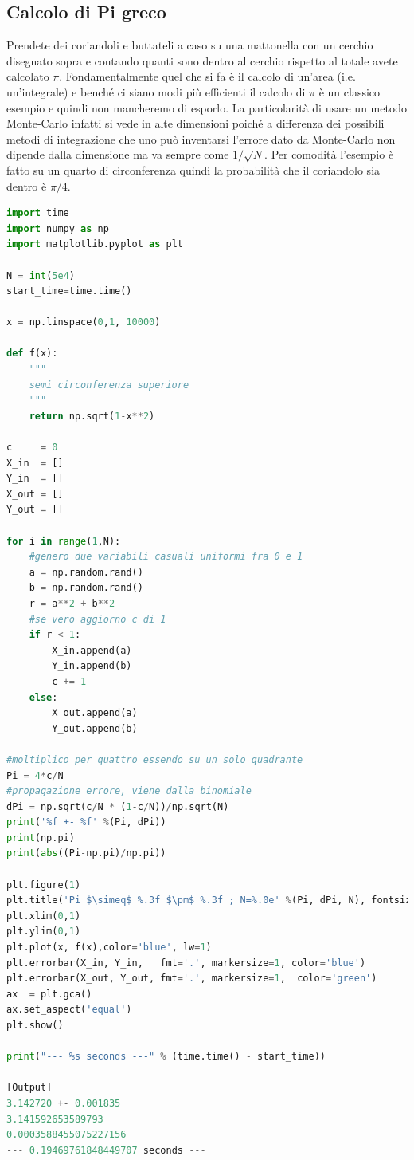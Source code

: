 \documentclass[10pt,a4paper]{article}
\begin{document}
\subsection{Calcolo di Pi greco}
Prendete dei coriandoli e buttateli a caso su una mattonella con un cerchio disegnato sopra e contando quanti sono dentro al cerchio rispetto al totale avete calcolato $\pi$.
Fondamentalmente quel che si fa è il calcolo di un'area (i.e. un'integrale) e benché ci siano modi più efficienti il calcolo di $\pi$ è un classico esempio e quindi non mancheremo di esporlo. La particolarità di usare un metodo Monte-Carlo infatti si vede in alte dimensioni poiché a differenza dei possibili metodi di integrazione che uno può inventarsi l'errore dato da Monte-Carlo non dipende dalla dimensione ma va sempre come $1/\sqrt{N}$. Per comodità l'esempio è fatto su un quarto di circonferenza quindi la probabilità che il coriandolo sia dentro è $\pi/4$.

\begin{lstlisting}[language=Python]
import time
import numpy as np
import matplotlib.pyplot as plt

N = int(5e4)
start_time=time.time()

x = np.linspace(0,1, 10000)

def f(x):
    """
    semi circonferenza superiore
    """
    return np.sqrt(1-x**2)

c     = 0
X_in  = []
Y_in  = []
X_out = []
Y_out = []

for i in range(1,N):
    #genero due variabili casuali uniformi fra 0 e 1
    a = np.random.rand()
    b = np.random.rand()
    r = a**2 + b**2
    #se vero aggiorno c di 1
    if r < 1:
        X_in.append(a)
        Y_in.append(b)
        c += 1
    else:
        X_out.append(a)
        Y_out.append(b)

#moltiplico per quattro essendo su un solo quadrante
Pi = 4*c/N
#propagazione errore, viene dalla binomiale
dPi = np.sqrt(c/N * (1-c/N))/np.sqrt(N)
print('%f +- %f' %(Pi, dPi))
print(np.pi)
print(abs((Pi-np.pi)/np.pi))

plt.figure(1)
plt.title('Pi $\simeq$ %.3f $\pm$ %.3f ; N=%.0e' %(Pi, dPi, N), fontsize=20)
plt.xlim(0,1)
plt.ylim(0,1)
plt.plot(x, f(x),color='blue', lw=1)
plt.errorbar(X_in, Y_in,   fmt='.', markersize=1, color='blue')
plt.errorbar(X_out, Y_out, fmt='.', markersize=1,  color='green')
ax  = plt.gca()
ax.set_aspect('equal')
plt.show()

print("--- %s seconds ---" % (time.time() - start_time))

[Output]
3.142720 +- 0.001835
3.141592653589793
0.0003588455075227156
--- 0.19469761848449707 seconds ---
\end{lstlisting}
\end{document}
